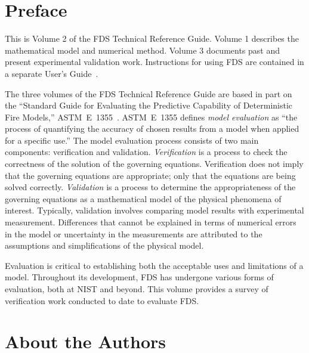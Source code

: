 \documentclass[11pt]{book}
\begin{document}
\frontmatter

\pagestyle{plain}


\chapter{Preface}

This is Volume 2 of the FDS Technical Reference Guide. Volume 1 describes the mathematical model and
numerical method. Volume 3 documents past and present experimental validation work. Instructions for
using FDS are contained in a separate User's Guide~\cite{FDS_Users_Guide_5}.

The three volumes of the FDS Technical Reference Guide are based in part on the ``Standard Guide for
Evaluating the Predictive Capability of Deterministic Fire Models,'' ASTM~E~1355~\cite{ASTM:E1355}.
ASTM~E~1355 defines {\em model evaluation} as ``the process of quantifying
the accuracy of chosen results from a model when applied for a specific use.''
The model evaluation process consists of two main components: verification and validation.
{\em Verification} is a process to check the correctness of the solution of the
governing equations. Verification does not imply that the governing equations are
appropriate; only that the equations are being solved correctly.
{\em Validation} is a process to determine the appropriateness of the governing equations as a mathematical
model of the physical phenomena of interest. Typically, validation involves comparing
model results with experimental measurement. Differences that cannot be explained in terms of
numerical errors in the model or uncertainty in the measurements
are attributed to the assumptions and simplifications of the physical model.

Evaluation is critical to establishing both the acceptable uses
and limitations of a model. Throughout its development, FDS has undergone various forms of evaluation,
both at NIST and beyond. This volume provides a survey of verification work conducted to date to evaluate FDS.



\chapter{About the Authors}
\end{document}
